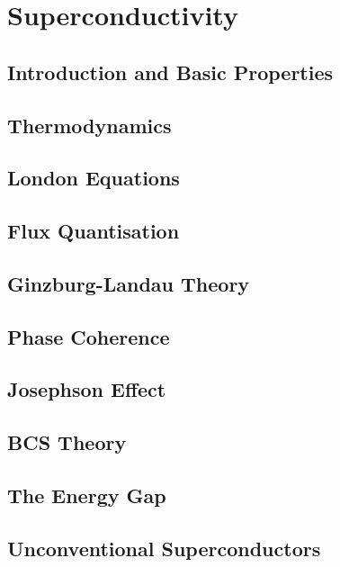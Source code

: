 \chapter{Superconductivity}
\label{chapt2} 

\section{Introduction and Basic Properties}

\section{Thermodynamics}

\section{London Equations}

\section{Flux Quantisation}

\section{Ginzburg-Landau Theory}

\section{Phase Coherence}

\section{Josephson Effect}

\section{BCS Theory}

\section{The Energy Gap}

\section{Unconventional Superconductors}